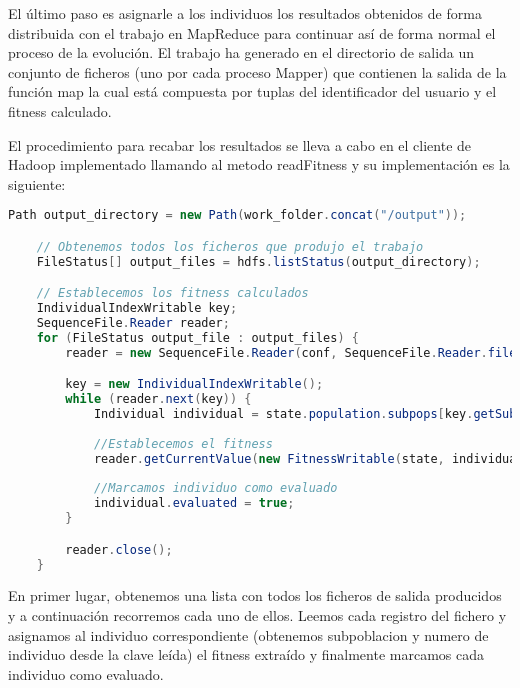 El \'ultimo paso es asignarle a los individuos los resultados obtenidos de forma distribuida con el trabajo en MapReduce para continuar así de forma normal el proceso de la evoluci\'on. El trabajo ha generado en el directorio de salida un conjunto de ficheros (uno por cada proceso Mapper) que contienen la salida de la función map la cual est\'a compuesta por tuplas del identificador del usuario y el fitness calculado.

El procedimiento para recabar los resultados se lleva a cabo en el cliente de Hadoop implementado llamando al metodo readFitness y su implementación es la siguiente:

\begin{lstlisting}[language=Java]
	Path output_directory = new Path(work_folder.concat("/output"));

	// Obtenemos todos los ficheros que produjo el trabajo
	FileStatus[] output_files = hdfs.listStatus(output_directory);

	// Establecemos los fitness calculados
	IndividualIndexWritable key;
	SequenceFile.Reader reader;
	for (FileStatus output_file : output_files) {
		reader = new SequenceFile.Reader(conf, SequenceFile.Reader.file(output_file.getPath()));

		key = new IndividualIndexWritable();
		while (reader.next(key)) {
			Individual individual = state.population.subpops[key.getSubpopulation()].individuals[key.getIndividual()];
			
			//Establecemos el fitness
			reader.getCurrentValue(new FitnessWritable(state, individual.fitness));
			
			//Marcamos individuo como evaluado
			individual.evaluated = true;
		}

		reader.close();
	}
\end{lstlisting}

En primer lugar, obtenemos una lista con todos los ficheros de salida producidos y a continuación recorremos cada uno de ellos. Leemos cada registro del fichero y asignamos al individuo correspondiente (obtenemos subpoblacion y numero de individuo desde la clave leída) el fitness extraído y finalmente marcamos cada individuo como evaluado.















